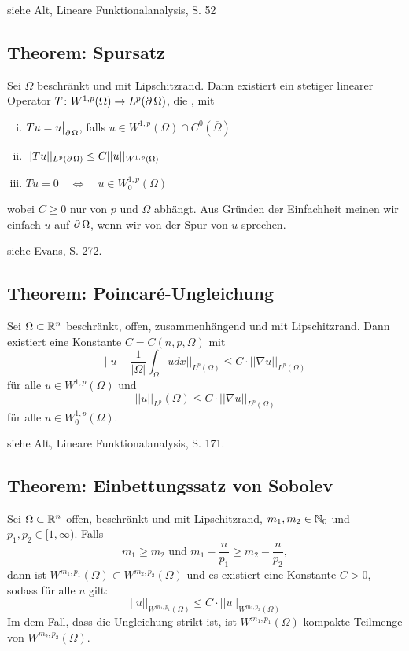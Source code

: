 	siehe Alt, \glqq Lineare Funktionalanalysis\grqq, S. 52
	
\subsection{Theorem: Spursatz}
\label{thm:spursatz} \label{thm_60}
	Sei $\Omega$ beschränkt und mit Lipschitzrand.\marginnote{[60]} Dann existiert ein stetiger linearer Operator $T\colon W^{1,p}(\Omega) \rightarrow L^p(\operatorname{\partial} \Omega)$, die , mit
	\begin{enumerate}[(i)]
		\item $Tu = u \big|_{\operatorname{\partial} \Omega}$, falls $u \in W^{1,p}(\Omega) \cap C^0(\overline{\Omega})$
		\item $||Tu||_{L^p(\operatorname{\partial} \Omega)} \leq C||u||_{W^{1,p}(\Omega)}$
		\item $Tu=0 \quad \Leftrightarrow \quad u \in W_0^{1,p}(\Omega)$
	\end{enumerate}
	wobei $C \geq 0$ nur von $p$ und $\Omega$ abhängt. Aus Gründen der Einfachheit meinen wir einfach  $u$ auf $\operatorname{\partial} \Omega$, wenn wir von der Spur von $u$ sprechen.
	
	siehe Evans, S. 272.
	
\subsection{Theorem: Poincaré-Ungleichung} 
\label{thm:poincare_ungl} \label{thm_61}
	Sei $\Omega \subset \mathbb{R}^n$ beschränkt, offen, \marginnote{[61]} zusammenhängend und mit Lipschitzrand. Dann existiert eine Konstante $C = C(n,p,\Omega)$ mit 
	\[ ||u- \frac{1}{|\Omega|} \int_{\Omega} u dx||_{L^p(\Omega)} \leq C \cdot ||\nabla u||_{L^p(\Omega)} \]
	für alle $u \in W^{1,p}(\Omega)$ und
	\[ ||u||_{L^p}(\Omega) \leq C \cdot ||\nabla u||_{L^p(\Omega)} \]
	für alle $u \in W_0^{1,p}(\Omega)$. 
	
	siehe Alt, \glqq Lineare Funktionalanalysis\grqq, S. 171.
	
\subsection{Theorem: Einbettungssatz von Sobolev}
\label{thm:sobolev_einbettung} \label{thm_62}
	Sei $\Omega \subset \mathbb{R}^n$ offen, beschränkt und mit Lipschitzrand, $m_1,m_2 \in \mathbb{N}_0$ und $p_1,p_2 \in [1,\infty)$. Falls \marginnote{[62]}
	\[ m_1 \geq m_2 \text{ und } m_1 - \frac{n}{p_1} \geq m_2 - \frac{n}{p_2}, \]
	dann ist $W^{m_1,p_1}(\Omega) \subset W^{m_2,p_2}(\Omega)$ und es existiert eine Konstante $C > 0$, sodass für alle $u$ gilt:
	\[ ||u||_{W^{m_1,p_1}(\Omega)} \leq C \cdot ||u||_{W^{m_2,p_2}(\Omega)} \]
	Im dem Fall, dass die Ungleichung strikt ist, ist $W^{m_1,p_1}(\Omega)$ kompakte Teilmenge von $W^{m_2,p_2}(\Omega)$.
	

